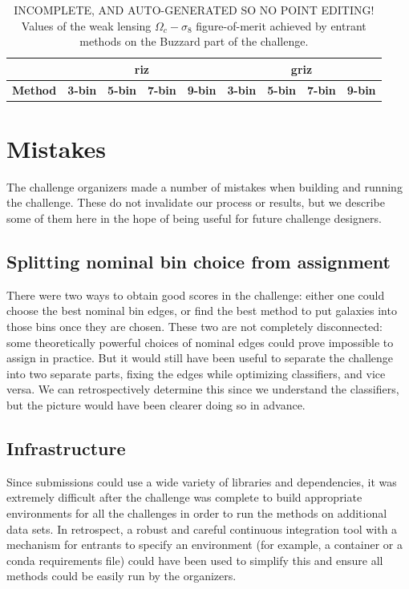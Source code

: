 \documentclass[twocolumn,twocolappendix]{aastex63}
\begin{document}
\begin{table}[]
\begin{tabular}{|l|llll|llll|}
                & \multicolumn{4}{c|}{\textbf{riz}}      & \multicolumn{4}{c|}{\textbf{griz}}                                \\ \hline
\textbf{Method} & \textbf{3-bin} & \textbf{5-bin} & \textbf{7-bin} & \textbf{9-bin} & \textbf{3-bin} & \textbf{5-bin} & \textbf{7-bin} & \textbf{9-bin} \\ \hline


\end{tabular}
\caption{INCOMPLETE, AND AUTO-GENERATED SO NO POINT EDITING! Values of the weak lensing $\Omega_c - \sigma_8$
figure-of-merit achieved by entrant methods on the Buzzard part of the challenge.}
\label{tab:buzzard_wl}
\end{table}

\section{Mistakes} \label{sec:mistakes}
The challenge organizers made a number of mistakes when building and running the challenge.
These do not invalidate our process or results, but we describe some of them here in the hope of
being useful for future challenge designers.

\subsection{Splitting nominal bin choice from assignment}
There were two ways to obtain good scores in the challenge: either one could choose the best
nominal bin edges, or find the best method to put galaxies into those bins once they are chosen.
These two are not completely disconnected: some theoretically powerful choices of nominal edges
could prove impossible to assign in practice.  But it would still have been useful to separate
the challenge into two separate parts, fixing the edges while optimizing classifiers, and vice
versa.   We can retrospectively determine this since we understand the classifiers, but the picture
would have been clearer doing so in advance.

\subsection{Infrastructure}
Since submissions could use a wide variety of libraries and dependencies, it was extremely
difficult after the challenge was complete to build appropriate environments for all the challenges
in order to run the methods on additional data sets. In retrospect, a robust and careful
continuous integration tool with a mechanism for entrants to specify an environment (for example, a 
container or a {\sc conda} requirements file) could have been used to simplify this and ensure
all methods could be easily run by the organizers.
\end{document}
